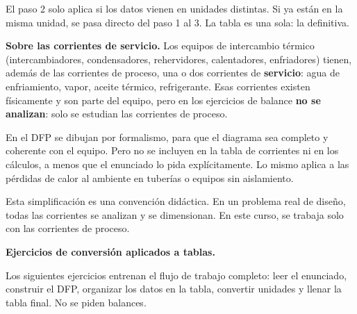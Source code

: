 El paso 2 solo aplica si los datos vienen en unidades distintas. Si
ya están en la misma unidad, se pasa directo del paso 1 al 3. La
tabla es una sola: la definitiva.

\begin{notaimportante}
\textbf{Sobre las corrientes de servicio.} Los equipos de intercambio
térmico (intercambiadores, condensadores, rehervidores, calentadores,
enfriadores) tienen, además de las corrientes de proceso, una o dos
corrientes de \textbf{servicio}: agua de enfriamiento, vapor, aceite
térmico, refrigerante. Esas corrientes existen físicamente y son
parte del equipo, pero en los ejercicios de balance \textbf{no se
analizan}: solo se estudian las corrientes de proceso.

En el DFP se dibujan por formalismo, para que el diagrama sea
completo y coherente con el equipo. Pero no se incluyen en la tabla
de corrientes ni en los cálculos, a menos que el enunciado lo pida
explícitamente. Lo mismo aplica a las pérdidas de calor al ambiente
en tuberías o equipos sin aislamiento.

Esta simplificación es una convención didáctica. En un problema real
de diseño, todas las corrientes se analizan y se dimensionan. En este
curso, se trabaja solo con las corrientes de proceso.
\end{notaimportante}


\textbf{Ejercicios de conversión aplicados a tablas.}

Los siguientes ejercicios entrenan el flujo de trabajo completo:
leer el enunciado, construir el DFP, organizar los datos en la tabla,
convertir unidades y llenar la tabla final. No se piden balances.

